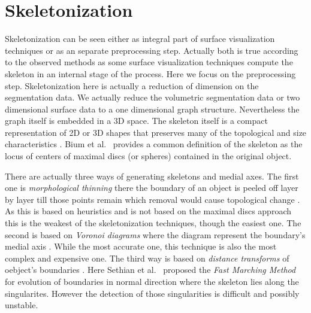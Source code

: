 \section{Skeletonization}

Skeletonization can be seen either as integral part of surface visualization techniques or as an separate preprocessing step. Actually both is true according to the observed methods as some surface visualization techniques compute the skeleton in an internal stage of the process. Here we focus on the preprocessing step.
Skeletonization here is actually a reduction of dimension on the segmentation data. We actually reduce the volumetric segmentation data or two dimensional surface data to a one dimensional graph structure. Nevertheless the graph itself is embedded in a 3D space.
The skeleton itself is a compact representation of 2D or 3D shapes that preserves many of the topological and size characteristics \cite{ebert2002augmented}. Bium et al.~\cite{bium1964transformation} provides a common definition of the skeleton as the locus of centers of maximal discs (or spheres) contained in the original object.

There are actually three ways of generating skeletons and medial axes. The first one is \emph{morphological thinning} there the boundary of an object is peeled off layer by layer till those points remain which removal would cause topological change \cite{ebert2002augmented}. As this is based on heuristics and is not based on the maximal discs approach this is the weakest of the skeletonization techniques, though the easiest one. The second is based on \emph{Voronoi diagrams} where the diagram represent the boundary's medial axis \cite{ebert2002augmented}. While the most accurate one, this technique is also the most complex and expensive one. The third way is based on \emph{distance transforms} of oebject's boundaries \cite{ebert2002augmented}. Here Sethian et al.~\cite{sethian1996fast} proposed the \emph{Fast Marching Method} for evolution of boundaries in normal direction where the skeleton lies along the singularites. However the detection of those singularities is difficult and possibly unstable.  

